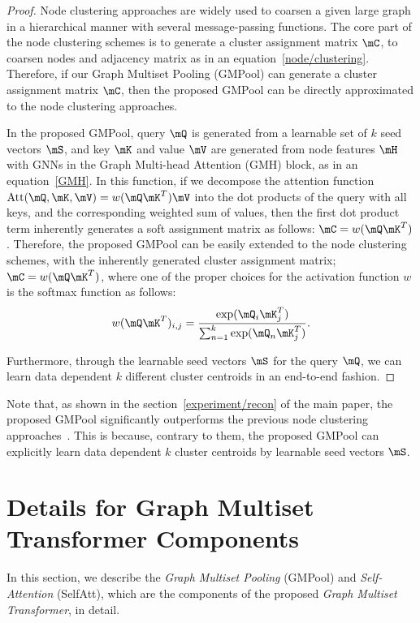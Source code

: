 \begin{proof}
Node clustering approaches are widely used to coarsen a given large graph in a hierarchical manner with several message-passing functions. The core part of the node clustering schemes is to generate a cluster assignment matrix $\mC$, to coarsen nodes and adjacency matrix as in an equation~\ref{node/clustering}. Therefore, if our Graph Multiset Pooling (GMPool) can generate a cluster assignment matrix $\mC$, then the proposed GMPool can be directly approximated to the node clustering approaches.

In the proposed GMPool, query $\mQ$ is generated from a learnable set of $k$ seed vectors $\mS$, and key $\mK$ and value $\mV$ are generated from node features $\mH$ with GNNs in the Graph Multi-head Attention (GMH) block, as in an equation~\ref{GMH}. In this function, if we decompose the attention function $\text{Att}(\mQ, \mK, \mV) = w(\mQ \mK^T)\mV$ into the dot products of the query with all keys, and the corresponding weighted sum of values, then the first dot product term inherently generates a soft assignment matrix as follows: $\mC = w(\mQ \mK^T)$. Therefore, the proposed GMPool can be easily extended to the node clustering schemes, with the inherently generated cluster assignment matrix; $\mC = w(\mQ \mK^T)$, where one of the proper choices for the activation function $w$ is the softmax function as follows: 
\begin{equation}
    w(\mQ \mK^T)_{i,j} = \frac{\exp(\mQ_i\mK_j^T)}{\sum_{n=1}^k \exp(\mQ_n \mK_j^T)}.
\end{equation}

Furthermore, through the learnable seed vectors $\mS$ for the query $\mQ$, we can learn data dependent $k$ different cluster centroids in an end-to-end fashion.
\end{proof}

Note that, as shown in the section~\ref{experiment/recon} of the main paper, the proposed GMPool significantly outperforms the previous node clustering approaches~\citep{DiffPool, MincutPool}. This is because, contrary to them, the proposed GMPool can explicitly learn data dependent $k$ cluster centroids by learnable seed vectors $\mS$.

\section{Details for Graph Multiset Transformer Components \label{appendix/model/detail}}
In this section, we describe the \emph{Graph Multiset Pooling} (GMPool) and \emph{Self-Attention} (SelfAtt), which are the components of the proposed \emph{Graph Multiset Transformer}, in detail.

